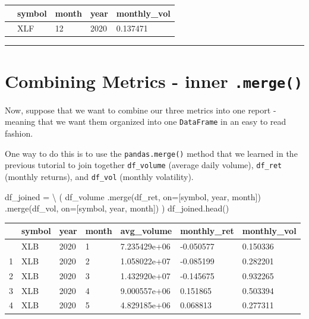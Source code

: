\documentclass[
  letterpaper,
  DIV=11,
  numbers=noendperiod]{scrreprt}
\newenvironment{Shaded}{\begin{snugshade}}{\end{snugshade}}
\newcommand{\NormalTok}[1]{\textcolor[rgb]{0.00,0.23,0.31}{#1}}
\newcommand{\OperatorTok}[1]{\textcolor[rgb]{0.37,0.37,0.37}{#1}}
\newcommand{\StringTok}[1]{\textcolor[rgb]{0.13,0.47,0.30}{#1}}
\begin{document}
\begin{longtable}[]{@{}lllll@{}}
\toprule\noalign{}
& symbol & month & year & monthly\_vol \\
\midrule\noalign{}
\endhead
\bottomrule\noalign{}
\endlastfoot
35 & XLF & 12 & 2020 & 0.137471 \\
\end{longtable}

\begin{center}\rule{0.5\linewidth}{0.5pt}\end{center}

\hypertarget{combining-metrics---inner-.merge}{%
\section{\texorpdfstring{Combining Metrics - inner
\texttt{.merge()}}{Combining Metrics - inner .merge()}}\label{combining-metrics---inner-.merge}}

Now, suppose that we want to combine our three metrics into one report -
meaning that we want them organized into one \texttt{DataFrame} in an
easy to read fashion.

One way to do this is to use the \texttt{pandas.merge()} method that we
learned in the previous tutorial to join together \texttt{df\_volume}
(average daily volume), \texttt{df\_ret} (monthly returns), and
\texttt{df\_vol} (monthly volatility).

\begin{Shaded}
\begin{Highlighting}[]
\NormalTok{df\_joined }\OperatorTok{=} \OperatorTok{\textbackslash{}}
\NormalTok{    (}
\NormalTok{    df\_volume}
\NormalTok{        .merge(df\_ret, on}\OperatorTok{=}\NormalTok{[}\StringTok{\textquotesingle{}symbol\textquotesingle{}}\NormalTok{, }\StringTok{\textquotesingle{}year\textquotesingle{}}\NormalTok{, }\StringTok{\textquotesingle{}month\textquotesingle{}}\NormalTok{])}
\NormalTok{        .merge(df\_vol, on}\OperatorTok{=}\NormalTok{[}\StringTok{\textquotesingle{}symbol\textquotesingle{}}\NormalTok{, }\StringTok{\textquotesingle{}year\textquotesingle{}}\NormalTok{, }\StringTok{\textquotesingle{}month\textquotesingle{}}\NormalTok{])}
\NormalTok{    )}
\NormalTok{df\_joined.head()}
\end{Highlighting}
\end{Shaded}

\begin{longtable}[]{@{}lllllll@{}}
\toprule\noalign{}
& symbol & year & month & avg\_volume & monthly\_ret & monthly\_vol \\
\midrule\noalign{}
\endhead
\bottomrule\noalign{}
\endlastfoot
0 & XLB & 2020 & 1 & 7.235429e+06 & -0.050577 & 0.150336 \\
1 & XLB & 2020 & 2 & 1.058022e+07 & -0.085199 & 0.282201 \\
2 & XLB & 2020 & 3 & 1.432920e+07 & -0.145675 & 0.932265 \\
3 & XLB & 2020 & 4 & 9.000557e+06 & 0.151865 & 0.503394 \\
4 & XLB & 2020 & 5 & 4.829185e+06 & 0.068813 & 0.277311 \\
\end{longtable}
\end{document}
